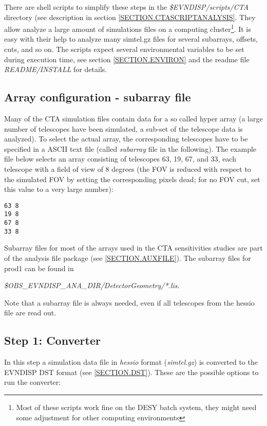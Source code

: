 \documentclass[titlepage,a4paper,twoside,11pt]{report}
\begin{document}
There are shell scripts to simplify these steps in the {\it \$EVNDISP/scripts/CTA} directory (see description in section \ref{SECTION.CTASCRIPTANALYSIS}.
They allow analyze a large amount of simulations files on a computing cluster\footnote{Most of these scripts work fine on the DESY batch system, they might need some adjustment for other computing environments}.
It is easy with their help to analyze many simtel.gz files for several subarrays, offsets, cuts, and so on. 
The scripts expect several environmental variables to be set during execution time, see section \ref{SECTION.ENVIRON} and the readme file {\it README/INSTALL} for details.

\subsection{Array configuration - subarray file}

Many of the CTA simulation files contain data for a so called hyper array 
(a large number of telescopes have been simulated, a sub-set of the telescope data is analyzed).
To select the actual array, the corresponding telescopes have to be specified in a ASCII text file (called {\it subarray} file in the following).
The  example file below selects an array consisting of telescopes 63, 19, 67, and 33, each telescope
with a field of view of 8 degrees (the FOV is reduced with respect to the simulated FOV by setting the corresponding pixels dead; for no FOV cut, set this value to a very large number):

\begin{lstlisting}
63 8
19 8
67 8
33 8
\end{lstlisting}

Subarray files for most of the arrays used in the CTA sensitivities studies are part of the analysis file package 
(see \ref{SECTION.AUXFILE}). The subarray files for prod1 can be found in 

{\it \$OBS\_EVNDISP\_ANA\_DIR/DetectorGeometry/*.lis}.

Note that a subarray file is always needed, even if all telescopes from the hessio file are read out.

\subsection{Step 1: Converter}

In this step a simulation data file in {\it hessio} format ({\it simtel.gz}) is converted to the EVNDISP DST format 
(see \ref{SECTION.DST}). These are the possible options to run the converter:
\end{document}
